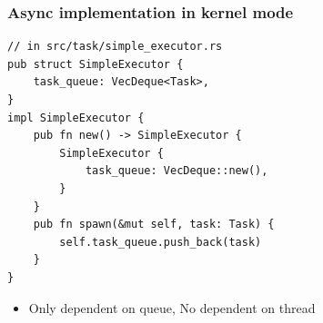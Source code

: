 \begin{frame}[fragile]
    \frametitle{Async implementation in kernel mode}
% 
% 
\begin{block}{}
    \begin{verbatim}
// in src/task/simple_executor.rs
pub struct SimpleExecutor {
    task_queue: VecDeque<Task>,
}
impl SimpleExecutor {
    pub fn new() -> SimpleExecutor {
        SimpleExecutor {
            task_queue: VecDeque::new(),
        }
    }
    pub fn spawn(&mut self, task: Task) {
        self.task_queue.push_back(task)
    }
}
    \end{verbatim}
\end{block}
% 
    \begin{itemize}
        \item Only dependent on queue, No dependent on thread
    \end{itemize}

\end{frame}
